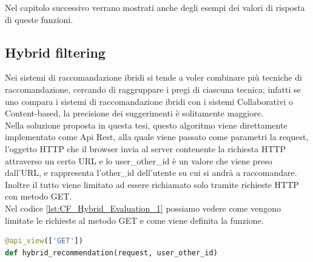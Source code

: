 
Nel capitolo successivo verrano mostrati anche degli esempi dei valori di risposta di queste funzioni.

\subsection{Hybrid filtering} 
Nei sistemi di raccomandazione ibridi si tende a voler combinare più tecniche di raccomandazione, cercando di raggruppare i 
pregi di ciascuna tecnica; infatti se uno compara i sistemi di raccomandazione ibridi con i sistemi Collaborativi o 
Content-based, la precisione dei suggerimenti è solitamente maggiore.\\

Nella soluzione proposta in questa tesi, questo algoritmo viene direttamente implementato come Api Rest, alla quale viene 
passato come parametri la request, l'oggetto HTTP che il browser invia al server contenente la richiesta HTTP attraverso
un certo URL e lo user\_other\_id è un valore che viene preso dall'URL, e rappresenta l'other\_id dell'utente su cui si andrà
a raccomandare. Inoltre il tutto viene limitato ad essere richiamato solo tramite richieste HTTP con metodo GET.\\ 
Nel codice \ref{lst:CF_Hybrid_Evaluation_1} possiamo vedere come vengono limitate le richieste al metodo GET e come 
viene definita la funzione.

\begin{lstlisting}[language=Python, label=lst:CF_Hybrid_Evaluation_1, caption={\ }]
@api_view(['GET'])
def hybrid_recommendation(request, user_other_id)
\end{lstlisting} 

